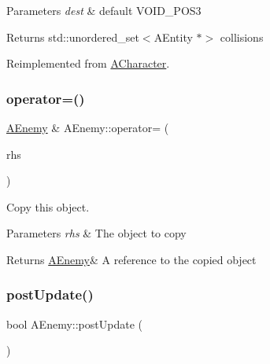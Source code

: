 \begin{DoxyParams}{Parameters}
{\em dest} & default V\+O\+I\+D\+\_\+\+P\+O\+S3 \\
\hline
\end{DoxyParams}
\begin{DoxyReturn}{Returns}
std\+::unordered\+\_\+set$<$\+A\+Entity $\ast$$>$ collisions 
\end{DoxyReturn}


Reimplemented from \hyperlink{class_a_character_a39c7111c4b096129d040e22e3b09592d}{A\+Character}.

\mbox{\label{class_a_enemy_a87e3db110aa11d461768f794bfb48c40}} 
\subsubsection{\texorpdfstring{operator=()}{operator=()}}
{\footnotesize\ttfamily \hyperlink{class_a_enemy}{A\+Enemy} \& A\+Enemy\+::operator= (\begin{DoxyParamCaption}\item[{\hyperlink{class_a_enemy}{A\+Enemy} const \&}]{rhs }\end{DoxyParamCaption})}



Copy this object. 


\begin{DoxyParams}{Parameters}
{\em rhs} & The object to copy \\
\hline
\end{DoxyParams}
\begin{DoxyReturn}{Returns}
\hyperlink{class_a_enemy}{A\+Enemy}\& A reference to the copied object 
\end{DoxyReturn}
\mbox{\label{class_a_enemy_a2d2ff5a126f14294bdbc17475c363d00}} 
\subsubsection{\texorpdfstring{post\+Update()}{postUpdate()}}
{\footnotesize\ttfamily bool A\+Enemy\+::post\+Update (\begin{DoxyParamCaption}{ }\end{DoxyParamCaption})\hspace{0.3cm}{\ttfamily [virtual]}}



